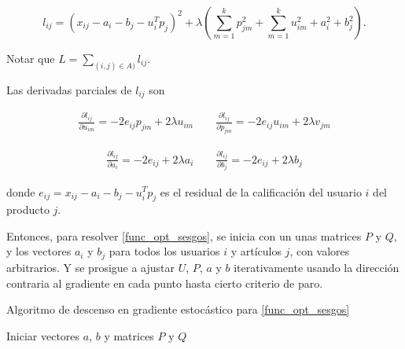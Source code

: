 \[
l_{ij} = \left( x_{ij} - a_i - b_j - u_i^T p_j \right) ^2
+ \lambda \left( 
\sum_{m = 1}^{k}p_{jm}^2 + 
\sum_{m = 1}^{k}u_{im}^2 + 
a_i^2 + 
b_j^2 \right) .
\]

Notar que $L = \sum_{(i,j) \in A)} l_{ij}$.

Las derivadas parciales de $l_{ij}$ son

\[
\begin{split}
\frac{\partial l_{ij}}{\partial u_{im}} = -2 e_{ij} p_{jm} + 2 \lambda u_{im} 
\qquad
\frac{\partial l_{ij}}{\partial p_{jm}} = -2 e_{ij} u_{im} + 2 \lambda v_{jm}
\end{split}
\]

\[
\begin{split}
\frac{\partial l_{ij}}{\partial a_i} = -2 e_{ij} + 2 \lambda a_i 
\qquad
\frac{\partial l_{ij}}{\partial b_j} = -2 e_{ij} + 2 \lambda b_j
\end{split}
\]

donde $e_{ij} =  x_{ij} - a_i - b_j - u_i^T p_j$ es el residual de la calificación del usuario $i$ del producto $j$.

Entonces, para resolver \ref{func_opt_sesgos}, se inicia con un unas matrices $P$ y $Q$, y los vectores $a_i$ y $b_j$ para todos los usuarios $i$ y artículos $j$, con valores arbitrarios. Y se prosigue a ajustar $U$, $P$, $a$ y $b$ iterativamente usando la dirección contraria al gradiente en cada punto hasta cierto criterio de paro.

\begin{algorithm}[ht]
 \caption{Algoritmo de descenso en gradiente estocástico para \ref{func_opt_sesgos}}
    \SetAlgoLined
    Iniciar vectores $a$, $b$ y matrices $P$ y $Q$\\
\end{algorithm}


